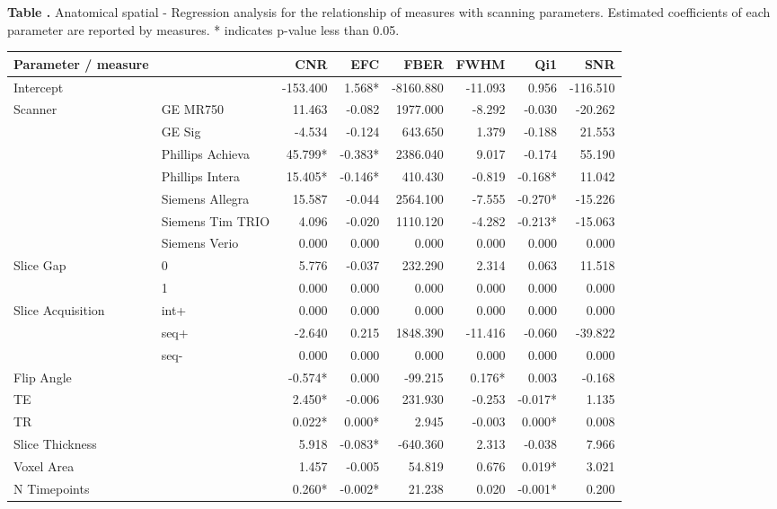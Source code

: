 \documentclass{frontiersSCNS} %
\begin{document}
\begin{table}
  \textbf{\label{anat_spat_reg} Table .}{ Anatomical spatial - Regression analysis for the relationship of measures with scanning parameters. Estimated coefficients of each parameter are reported by measures. * indicates p-value less than 0.05.  }
  \begin{center}
    \begin{tabular}{ l l r r r r r r }
    \hline
    Parameter / measure & & CNR & EFC & FBER & FWHM & Qi1 & SNR \\ \hline
    Intercept & & -153.400 & 1.568* & -8160.880 & -11.093 & 0.956 & -116.510 \\
    Scanner & GE MR750 & 11.463 & -0.082 & 1977.000 & -8.292 & -0.030 & -20.262 \\
     & GE Sig & -4.534 & -0.124 & 643.650 & 1.379 & -0.188 & 21.553 \\
     & Phillips Achieva & 45.799* & -0.383* & 2386.040 & 9.017 & -0.174 & 55.190 \\
     & Phillips Intera & 15.405* & -0.146* & 410.430 & -0.819 & -0.168* & 11.042 \\
     & Siemens Allegra & 15.587 & -0.044 & 2564.100 & -7.555 & -0.270* & -15.226 \\
     & Siemens Tim TRIO & 4.096 & -0.020 & 1110.120 & -4.282 & -0.213* & -15.063 \\
     & Siemens Verio & 0.000 & 0.000 & 0.000 & 0.000 & 0.000 & 0.000 \\
    Slice Gap & 0 & 5.776 & -0.037 & 232.290 & 2.314 & 0.063 & 11.518 \\
     & 1 & 0.000 & 0.000 & 0.000 & 0.000 & 0.000 & 0.000 \\
    Slice Acquisition & int+ & 0.000 & 0.000 & 0.000 & 0.000 & 0.000 & 0.000 \\
     & seq+ & -2.640 & 0.215 & 1848.390 & -11.416 & -0.060 & -39.822 \\
     & seq- & 0.000 & 0.000 & 0.000 & 0.000 & 0.000 & 0.000 \\
    Flip Angle & & -0.574* & 0.000 & -99.215 & 0.176* & 0.003 & -0.168 \\
    TE & & 2.450* & -0.006 & 231.930 & -0.253 & -0.017* & 1.135 \\
    TR & & 0.022* & 0.000* & 2.945 & -0.003 & 0.000* & 0.008 \\
    Slice Thickness & & 5.918 & -0.083* & -640.360 & 2.313 & -0.038 & 7.966 \\
    Voxel Area & & 1.457 & -0.005 & 54.819 & 0.676 & 0.019* & 3.021 \\
    N Timepoints & & 0.260* & -0.002* & 21.238 & 0.020 & -0.001* & 0.200 \\
    \hline
    \end{tabular}
  \end{center}
\end{table}
\end{document}
